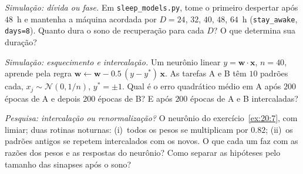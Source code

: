 \begin{exercise}[\lvlB]
\label{ex:20:6}
\emph{Simulação: dívida ou fase.} Em \texttt{sleep\_models.py}, tome o primeiro despertar após $48$~h e mantenha a máquina acordada por $D=24$, $32$, $40$, $48$, $64$~h (\texttt{stay\_awake}, \texttt{days=8}). Quanto dura o sono de recuperação para cada $D$? O que determina sua duração?
\end{exercise}

\begin{exercise}[\lvlB]
\label{ex:20:7}
\emph{Simulação: esquecimento e intercalação.} Um neurônio linear $y=\mathbf w\cdot\mathbf x$, $n=40$, aprende pela regra $\mathbf w\leftarrow\mathbf w-0.5\,(y-y^*)\,\mathbf x$. As tarefas A e B têm $10$ padrões cada, $x_j\sim\mathcal N(0,1/n)$, $y^*=\pm1$. Qual é o erro quadrático médio em A após $200$ épocas de A e depois $200$ épocas de B? E após $200$ épocas de A e B intercaladas?
\end{exercise}

\begin{exercise}[\lvlC]
\label{ex:20:8}
\emph{Pesquisa: intercalação ou renormalização?} O neurônio do exercício~\ref{ex:20:7}, com limiar; duas rotinas noturnas: (i)~todos os pesos se multiplicam por $0.82$; (ii)~os padrões antigos se repetem intercalados com os novos. O que cada um faz com as razões dos pesos e as respostas do neurônio? Como separar as hipóteses pelo tamanho das sinapses após o sono?
\end{exercise}

